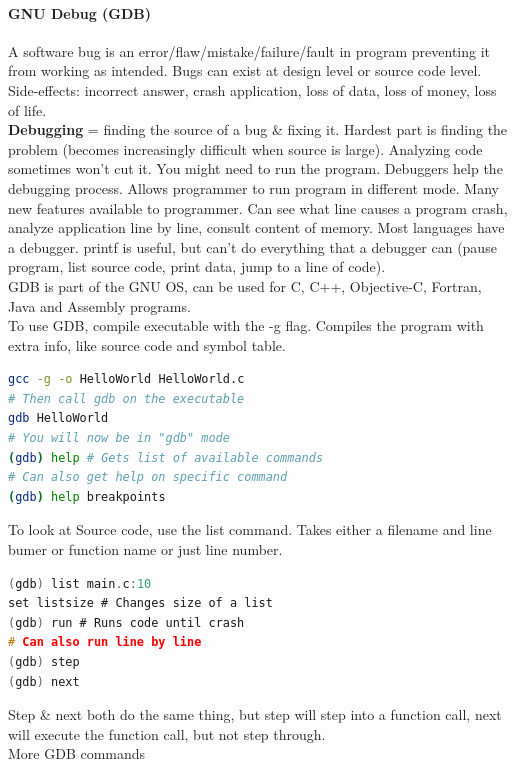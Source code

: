 \documentclass[12 pt]{article}
\begin{document}
\paragraph{GNU Debug (GDB)}
A software bug is an error/flaw/mistake/failure/fault in program preventing it from working as intended. Bugs can exist at design level or source code level. Side-effects: incorrect answer, crash application, loss of data, loss of money, loss of life.
\\ \textbf{Debugging} = finding the source of a bug \& fixing it. Hardest part is finding the problem (becomes increasingly difficult when source is large). Analyzing code sometimes won't cut it. You might need to run the program. Debuggers help the debugging process. Allows programmer to run program in different mode. Many new features available to programmer. Can see what line causes a program crash, analyze application line by line, consult content of memory. Most languages have a debugger. printf is useful, but can't do everything that a debugger can (pause program, list source code, print data, jump to a line of code).
\\ GDB is part of the GNU OS, can be used for C, C++, Objective-C, Fortran, Java and Assembly programs.
\\ To use GDB, compile executable with the -g flag. Compiles the program with extra info, like source code and symbol table. 
\begin{lstlisting}[language=bash]
gcc -g -o HelloWorld HelloWorld.c
# Then call gdb on the executable
gdb HelloWorld
# You will now be in "gdb" mode
(gdb) help # Gets list of available commands
# Can also get help on specific command
(gdb) help breakpoints
\end{lstlisting}
To look at Source code, use the list command. Takes either a filename and line bumer or function name or just line number.
\begin{lstlisting}[language=c]
(gdb) list main.c:10
set listsize # Changes size of a list
(gdb) run # Runs code until crash
# Can also run line by line
(gdb) step
(gdb) next 
\end{lstlisting}
Step \& next both do the same thing, but step will step into a function call, next will execute the function call, but not step through.
\\ More GDB commands
\end{document}
